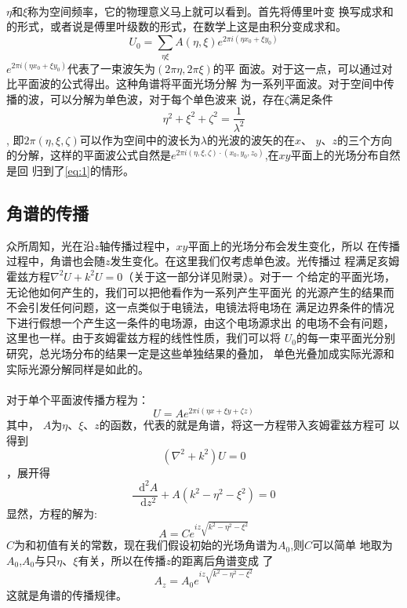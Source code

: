 \documentclass{article}
\newcommand*{\dif}{\mathop{}\!\mathrm{d}}
\begin{document}
\paragraph{}
$\eta$和$\xi$称为空间频率，它的物理意义马上就可以看到。首先将傅里叶变
换写成求和的形式，或者说是傅里叶级数的形式，在数学上这是由积分变成求和。
\begin{equation}
  \label{eq:1}
  U_0=\sum_{\eta \xi}A(\eta,\xi)e^{2\pi i(\eta x_0+\xi y_0)}
\end{equation}
$e^{2\pi i(\eta x_0+\xi y_0)}$代表了一束波矢为$(2\pi\eta,2\pi\xi)$的平
面波。对于这一点，可以通过对比平面波的公式得出。这种角谱将平面光场分解
为一系列平面波。对于空间中传播的波，可以分解为单色波，对于每个单色波来
说，存在$\zeta$满足条件\[\eta^2+\xi^2+\zeta^{2}=\frac{1}{\lambda^2}\],
即$2\pi(\eta,\xi,\zeta)$可以作为空间中的波长为$\lambda$的光波的波矢的在$x$、
$y$、$z$的三个方向的分解，这样的平面波公式自然是$e^{2\pi
  i(\eta,\xi,\zeta)\cdot(x_0,y_0,z_0)}$,在$xy$平面上的光场分布自然是回
归到了\ref{eq:1}的情形。
\subsection{角谱的传播}
众所周知，光在沿$z$轴传播过程中，$xy$平面上的光场分布会发生变化，所以
在传播过程中，角谱也会随$z$发生变化。在这里我们仅考虑单色波。光传播过
程满足亥姆霍兹方程$\nabla^2U+k^2U=0$（关于这一部分详见附录）。对于一
个给定的平面光场，无论他如何产生的，我们可以把他看作为一系列产生平面光
的光源产生的结果而不会引发任何问题，这一点类似于电镜法，电镜法将电场在
满足边界条件的情况下进行假想一个产生这一条件的电场源，由这个电场源求出
的电场不会有问题，这里也一样。由于亥姆霍兹方程的线性性质，我们可以将
$U_0$的每一束平面光分别研究，总光场分布的结果一定是这些单独结果的叠加，
单色光叠加成实际光源和实际光源分解同样是如此的。
\paragraph{}
对于单个平面波传播方程为：\[U=Ae^{2\pi i(\eta x+\xi y+\zeta z)}\]其中，
$A$为$\eta$、$\xi$、$z$的函数，代表的就是角谱，将这一方程带入亥姆霍兹方程可
以得到\[(\nabla^2+k^2)U=0\]，展开得\[\frac{\dif^2A}{\dif
    z^2}+A(k^2-\eta^2-\xi^2)=0\]显然，方程的解为:
\begin{equation}
  \label{eq:2}
  A=Ce^{iz \sqrt{k^2-\eta^2-\xi^2}}
\end{equation}
$C$为和初值有关的常数，现在我们假设初始的光场角谱为$A_0$,则$C$可以简单
地取为$A_0$,$A_0$与只$\eta$、$\xi$有关，所以在传播$z$的距离后角谱变成
了
\begin{equation}
  \label{eq:3}
  A_z=A_0e^{iz \sqrt{k^2-\eta^2-\xi^2}}
\end{equation}
这就是角谱的传播规律。
\end{document}
